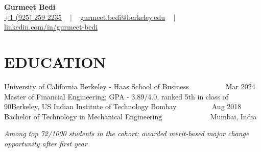 


\begin{center}
{\Huge  \textbf{Gurmeet Bedi}} \\ \vspace{1pt}
\small
\href{tel:19252592235}{+1 (925) 259 2235} 
~ $\mid$ ~
\href{mailto:gurmeet.bedi@berkeley.edu}{ gurmeet.bedi@berkeley.edu} 
~ $\mid$ ~
\href{https://www.linkedin.com/in/gurmeet-bedi/}{linkedin.com/in/gurmeet-bedi} 
\\
\vspace{-8pt}
\end{center}


\section{EDUCATION}
  \resumeSubHeadingListStart
  \resumeSubheading
      {University of California Berkeley - Haas School of Business}{\textcolor{white}{Mar 2023 - }Mar 2024}
      {Master \textcolor{white}{}of Financial Engineering; GPA - 3.89/4.0, ranked 5th in class of 90}{Berkeley, US}{}
    \resumeSubheading
      {Indian Institute of Technology Bombay}{\textcolor{white}{Jun 2014 - }Aug 2018}
      {Bachelor of Technology in Mechanical Engineering \textcolor{white}{GPA - 7.33/10}}{Mumbai, India}{}
      
    \begin{itemize}[leftmargin=0.0in, label={}]
    \small{\textit{Among top 72/1000 students in the cohort; awarded merit-based major change opportunity after first year}}
    \vspace{-3pt}
    \end{itemize}
  \resumeSubHeadingListEnd

